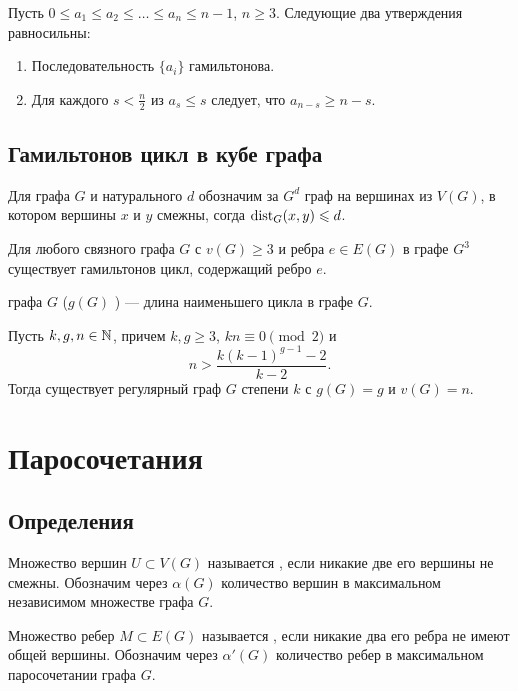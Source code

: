 \begin{theorem}[Хватал, 1972]
	Пусть $0 \le a_1 \le a_2 \le \ldots \le a_{n} \le n-1$, $n \ge 3$. Следующие два утверждения равносильны:
	\begin{enumerate}
		\item Последовательность $\{a_i\}$ гамильтонова.
		\item Для каждого $s < \frac{n}{2}$ из $a_s \le s$ следует, что $a_{n-s} \ge n-s$.
	\end{enumerate}
\end{theorem}
\section{Гамильтонов цикл в кубе графа}
\begin{definition}[]
	Для графа $G$ и натурального $d$ обозначим за $G^{d}$ граф на вершинах из $V(G)$, в котором вершины  $x$ и $y$ смежны, согда $ \operatorname{dist}_{G}(x, y) \leqslant d$.
\end{definition}
\begin{theorem}
	Для любого связного графа $G$ с $v(G) \ge 3$ и ребра $e \in E(G)$ в графе $G^{3}$ существует гамильтонов цикл, содержащий ребро $e$.
\end{theorem}

\begin{definition}[]
	 графа $G$ ($g(G)$ ) --- длина наименьшего цикла в графе $G$.
\end{definition}

\begin{theorem}[Татт]
	Пусть $k, g, n \in \mathbb{N}$, причем $k, g \ge 3$, $kn \equiv 0 \pmod 2$ и \[
	n > \frac{k(k-1)^{g-1} -2}{k-2}
	.\] 
	Тогда существует регулярный граф $G$ степени $k$ с $g(G) = g$ и $v(G) = n$.
\end{theorem}

\chapter{Паросочетания}
\section{Определения}
\begin{definition}[]
	Множество  вершин $U \subset V(G)$ называется , если никакие две его вершины не смежны. Обозначим через $\alpha(G)$ количество вершин в максимальном независимом множестве графа $G$. 
\end{definition}
\begin{definition}[]
	Множество ребер $M \subset E(G)$ называется , если никакие два его ребра не имеют общей вершины. Обозначим через $\alpha'(G)$ количество  ребер в максимальном паросочетании графа $G$.
\end{definition}

